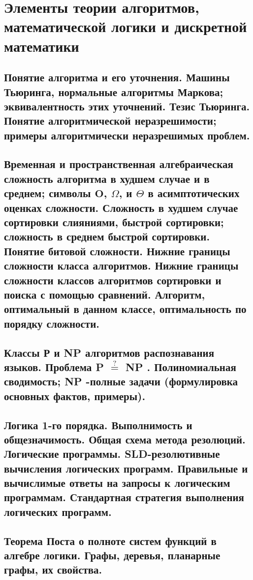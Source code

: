 \section{Элементы теории алгоритмов, математической логики и дискретной математики}

\subsection{Понятие алгоритма и его уточнения. Машины Тьюринга, нормальные алгоритмы Маркова; эквивалентность этих уточнений. Тезис Тьюринга. Понятие алгоритмической неразрешимости; примеры алгоритмически неразрешимых проблем.}
\subsection{Временная и пространственная алгебраическая сложность алгоритма в худшем случае и в среднем; символы $\mathbf{O}$, $\Omega$, и $\Theta$ в асимптотических оценках сложности. Сложность в худшем случае сортировки слияниями, быстрой сортировки; сложность в среднем быстрой сортировки. Понятие битовой сложности. Нижние границы сложности класса алгоритмов. Нижние границы сложности классов алгоритмов сортировки и поиска с помощью сравнений. Алгоритм, оптимальный в данном классе, оптимальность по порядку сложности.}
\subsection{Классы Р и NP алгоритмов распознавания языков. Проблема P $\stackrel{?}{=}$ NP . Полиномиальная сводимость; NP -полные задачи (формулировка основных фактов, примеры).}
\subsection{Логика 1-го порядка. Выполнимость и общезначимость. Общая схема метода резолюций. Логические программы. SLD-резолютивные вычисления логических программ. Правильные и вычислимые ответы на запросы к логическим программам. Стандартная стратегия выполнения логических программ.}
\subsection{Теорема Поста о полноте систем функций в алгебре логики. Графы, деревья, планарные графы, их свойства. }